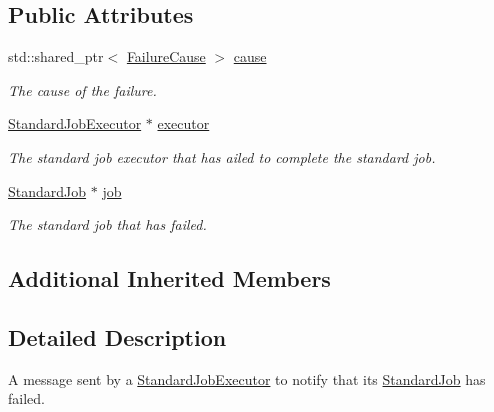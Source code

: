 \subsection*{Public Attributes}
\begin{DoxyCompactItemize}
\item 
\mbox{\label{classwrench_1_1_standard_job_executor_failed_message_a03339ea624a998d5112bacf453a8690f}} 
std\+::shared\+\_\+ptr$<$ \hyperlink{classwrench_1_1_failure_cause}{Failure\+Cause} $>$ \hyperlink{classwrench_1_1_standard_job_executor_failed_message_a03339ea624a998d5112bacf453a8690f}{cause}
\begin{DoxyCompactList}\small\item\em The cause of the failure. \end{DoxyCompactList}\item 
\mbox{\label{classwrench_1_1_standard_job_executor_failed_message_a5e3ba877c421ffa8315cdf6553879a8e}} 
\hyperlink{classwrench_1_1_standard_job_executor}{Standard\+Job\+Executor} $\ast$ \hyperlink{classwrench_1_1_standard_job_executor_failed_message_a5e3ba877c421ffa8315cdf6553879a8e}{executor}
\begin{DoxyCompactList}\small\item\em The standard job executor that has ailed to complete the standard job. \end{DoxyCompactList}\item 
\mbox{\label{classwrench_1_1_standard_job_executor_failed_message_a91f2726c78576faf32f575f95aef3ee1}} 
\hyperlink{classwrench_1_1_standard_job}{Standard\+Job} $\ast$ \hyperlink{classwrench_1_1_standard_job_executor_failed_message_a91f2726c78576faf32f575f95aef3ee1}{job}
\begin{DoxyCompactList}\small\item\em The standard job that has failed. \end{DoxyCompactList}\end{DoxyCompactItemize}
\subsection*{Additional Inherited Members}


\subsection{Detailed Description}
A message sent by a \hyperlink{classwrench_1_1_standard_job_executor}{Standard\+Job\+Executor} to notify that its \hyperlink{classwrench_1_1_standard_job}{Standard\+Job} has failed. 

